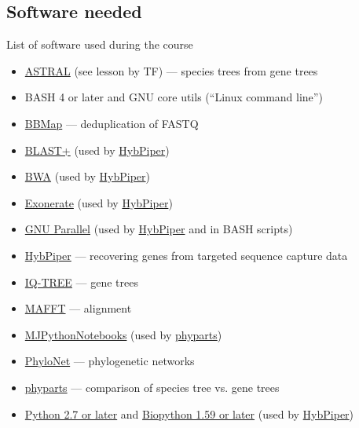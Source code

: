 \documentclass[compress, ucs, xelatex, 11pt, xcolor=x11names, aspectratio=1609,
	hyperref={
		bookmarks=true,
		unicode=true,
		colorlinks=true,
		pdftitle={HybSeq course},
		plainpages=false,
		pdfauthor={Vojtech Zeisek},
		pdfsubject={Practical processing of HybSeq target enrichment sequencing data on computing grids like MetaCentrum},
		pdfcreator={XeLaTeX},
		pdfkeywords={BASH, command line, GNU, HybSeq, Linux, MetaCentrum, sequencing shell, target enrichment},
		linkcolor=Cyan2, %
		anchorcolor=Firebrick2, %
		citecolor=Firebrick2, %
		filecolor=Firebrick2, %
		menucolor=Firebrick2, %
		urlcolor=Chartreuse2, %
		pdftex},
	url={hyphens, lowtilde} %
	]{beamer}
\begin{document}
\subsection{Software needed}

\begin{frame}[allowframebreaks]{List of software used during the course}
	\begin{itemize}
		\item \href{https://github.com/smirarab/ASTRAL}{ASTRAL} (see lesson by TF) --- species trees from gene trees
		\item BASH 4 or later and GNU core utils (\enquote{Linux command line})
		\item \href{https://sourceforge.net/projects/bbmap/}{BBMap} --- deduplication of FASTQ
		\item \href{ftp://ftp.ncbi.nlm.nih.gov/blast/executables/blast+/}{BLAST+} (used by \href{https://github.com/mossmatters/HybPiper/wiki}{HybPiper})
		\item \href{https://github.com/lh3/bwa}{BWA} (used by \href{https://github.com/mossmatters/HybPiper/wiki}{HybPiper})
		\item \href{https://www.ebi.ac.uk/about/vertebrate-genomics/software/exonerate}{Exonerate} (used by \href{https://github.com/mossmatters/HybPiper/wiki}{HybPiper})
		\item \href{https://www.gnu.org/software/parallel/}{GNU Parallel} (used by \href{https://github.com/mossmatters/HybPiper/wiki}{HybPiper} and in BASH scripts)
		\item \href{https://github.com/mossmatters/HybPiper/wiki}{HybPiper} --- recovering genes from targeted sequence capture data
		\item \href{http://www.iqtree.org/}{IQ-TREE} --- gene trees
		\item \href{https://mafft.cbrc.jp/alignment/software/}{MAFFT} --- alignment
		\item \href{https://github.com/mossmatters/MJPythonNotebooks}{MJPythonNotebooks} (used by \href{https://bitbucket.org/blackrim/phyparts}{phyparts})
		\item \href{https://bioinfocs.rice.edu/PhyloNet}{PhyloNet} --- phylogenetic networks
		\item \href{https://bitbucket.org/blackrim/phyparts}{phyparts} --- comparison of species tree vs. gene trees
		\item \href{https://www.python.org/}{Python 2.7 or later} and \href{https://biopython.org/}{Biopython 1.59 or later} (used by \href{https://github.com/mossmatters/HybPiper/wiki}{HybPiper})

\end{itemize}
\end{frame}
\end{document}
